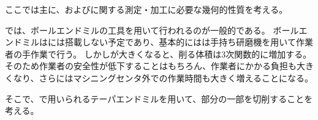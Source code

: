 

ここでは主に、\textbf{\EndFaceOutRChamfer}および\textbf{\EndFaceInRChamfer}に関する測定・加工に必要な幾何的性質を考える。

\EndFaceRChamferMilling では、ボールエンドミルの工具を用いて行われるのが一般的である。
ボールエンドミルは\DMC には搭載しない予定であり、基本的には\EndFaceRChamfer は手持ち研磨機を用いて作業者の手作業で行う。
しかし\EndFaceChamferLength が大きくなると、削る体積は3次関数的に増加する。
そのため作業者の安全性が低下することはもちろん、作業者にかかる負担も大きくなり、さらにはマシニングセンタ外での作業時間も大きく増えることになる。

そこで、\EndFaceCChamferMilling で用いられるテーパエンドミルを用いて、\EndFaceRChamfer 部分の一部を切削することを考える。



